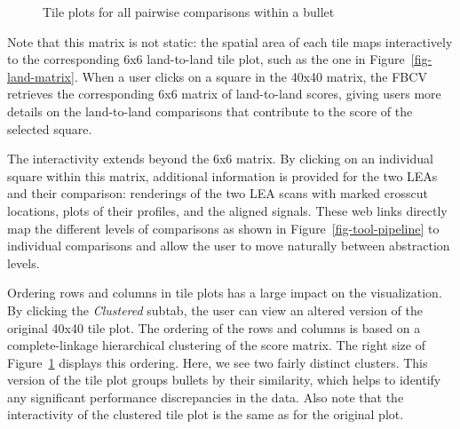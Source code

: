 \documentclass[
  12pt]{article}
\begin{document}
\begin{figure}


\caption{\label{fig-tilePlots}Tile plots for all pairwise comparisons
within a bullet}

\end{figure}%

Note that this matrix is not static: the spatial area of each tile maps
interactively to the corresponding 6x6 land-to-land tile plot, such as
the one in Figure~\ref{fig-land-matrix}. When a user clicks on a square
in the 40x40 matrix, the FBCV retrieves the corresponding 6x6 matrix of
land-to-land scores, giving users more details on the land-to-land
comparisons that contribute to the score of the selected square.

The interactivity extends beyond the 6x6 matrix. By clicking on an
individual square within this matrix, additional information is provided
for the two LEAs and their comparison: renderings of the two LEA scans
with marked crosscut locations, plots of their profiles, and the aligned
signals. These web links directly map the different levels of
comparisons as shown in Figure~\ref{fig-tool-pipeline} to individual
comparisons and allow the user to move naturally between abstraction
levels.

Ordering rows and columns in tile plots has a large impact on the
visualization. By clicking the \emph{Clustered} subtab, the user can
view an altered version of the original 40x40 tile plot. The ordering of
the rows and columns is based on a complete-linkage hierarchical
clustering of the score matrix. The right size of
Figure~\ref{fig-tilePlots} displays this ordering. Here, we see two
fairly distinct clusters. This version of the tile plot groups bullets
by their similarity, which helps to identify any significant performance
discrepancies in the data. Also note that the interactivity of the
clustered tile plot is the same as for the original plot.
\end{document}
